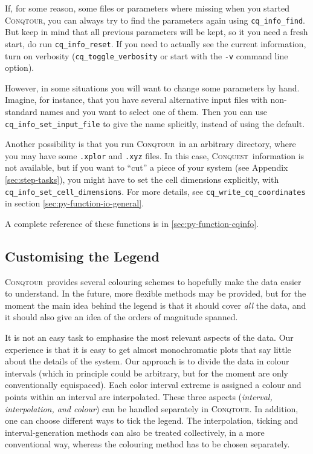 \documentclass[a4paper,notitlepage,11pt]{article}
\def\CQ{\textsc{Conquest}}
\def\Conqtour{\textsc{Conqtour}}
\begin{document}
If, for some reason, some files or parameters where missing when you started
\Conqtour, you can always try to find the parameters again using
\texttt{cq\_info\_find}. But keep in mind that all previous parameters will be
kept, so it you need a fresh start, do run
\texttt{cq\_info\_reset}. If you need to actually see the current information,
turn on verbosity (\texttt{cq\_toggle\_verbosity} or start with the
\texttt{-v} command line option).

However, in some situations you will want to change some parameters by hand.
Imagine, for instance, that you have
several alternative input files with non-standard names and you want to select
one of them. Then you can use \texttt{cq\_info\_set\_input\_file} to give the
name splicitly, instead of using the default.

Another possibility is that you run \Conqtour\ in an arbitrary directory,
where you may have some \texttt{.xplor}  and \texttt{.xyz}
 files. In this case, \CQ\ information is not available, but
if you want to ``cut'' a piece of your system (see Appendix \ref{sec:step-tasks}), you might have to set the cell
dimensions explicitly, with \texttt{cq\_info\_set\_cell\_dimensions}. For more
details, see \texttt{cq\_write\_cq\_coordinates} in section
\ref{sec:py-function-io-general}.

A complete reference of these functions is in \ref{sec:py-function-cqinfo}.

\subsection{Customising the Legend}
\label{sec:custom-legend}

\Conqtour\ provides several colouring schemes to hopefully make the data easier
to understand. In the future, more flexible methods may be provided, but for the
moment the main idea behind the legend is that it should cover \emph{all} the
data, and it should also
give an idea of the orders of magnitude spanned.

It is not an easy task to emphasise the most relevant aspects of the data. Our
experience is that it is easy to get almost monochromatic plots that say little
about the details of the system. Our approach is to divide the data in colour
intervals (which in principle could be arbitrary, but for the moment are only
conventionally equispaced). Each color interval extreme
is assigned a colour and points within an interval are interpolated. These three
aspects (\emph{interval, interpolation, and colour}) can be handled separately
in \Conqtour. In addition, one can choose different ways to tick the legend. The
interpolation, ticking and interval-generation methods can also be treated
collectively, in a more conventional way, whereas the colouring method has to be
chosen separately.
\end{document}
